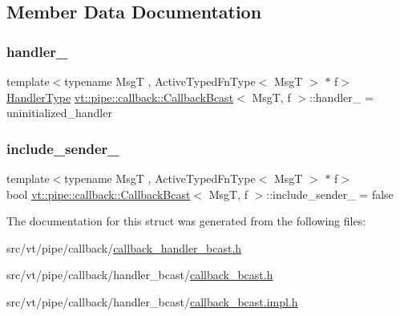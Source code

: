 \subsection{Member Data Documentation}
\mbox{\label{structvt_1_1pipe_1_1callback_1_1_callback_bcast_a3ea3dbcdb923e07ef664094954313eb1}} 
\subsubsection{\texorpdfstring{handler\+\_\+}{handler\_}}
{\footnotesize\ttfamily template$<$typename MsgT , Active\+Typed\+Fn\+Type$<$ Msg\+T $>$ $\ast$ f$>$ \\
\hyperlink{namespacevt_af64846b57dfcaf104da3ef6967917573}{Handler\+Type} \hyperlink{structvt_1_1pipe_1_1callback_1_1_callback_bcast}{vt\+::pipe\+::callback\+::\+Callback\+Bcast}$<$ MsgT, f $>$\+::handler\+\_\+ = uninitialized\+\_\+handler\hspace{0.3cm}{\ttfamily [private]}}

\mbox{\label{structvt_1_1pipe_1_1callback_1_1_callback_bcast_a143859ea6a28eec100d0e2b19d13b004}} 
\subsubsection{\texorpdfstring{include\+\_\+sender\+\_\+}{include\_sender\_}}
{\footnotesize\ttfamily template$<$typename MsgT , Active\+Typed\+Fn\+Type$<$ Msg\+T $>$ $\ast$ f$>$ \\
bool \hyperlink{structvt_1_1pipe_1_1callback_1_1_callback_bcast}{vt\+::pipe\+::callback\+::\+Callback\+Bcast}$<$ MsgT, f $>$\+::include\+\_\+sender\+\_\+ = false\hspace{0.3cm}{\ttfamily [private]}}



The documentation for this struct was generated from the following files\+:\begin{DoxyCompactItemize}
\item 
src/vt/pipe/callback/\hyperlink{callback__handler__bcast_8h}{callback\+\_\+handler\+\_\+bcast.\+h}\item 
src/vt/pipe/callback/handler\+\_\+bcast/\hyperlink{callback__bcast_8h}{callback\+\_\+bcast.\+h}\item 
src/vt/pipe/callback/handler\+\_\+bcast/\hyperlink{callback__bcast_8impl_8h}{callback\+\_\+bcast.\+impl.\+h}\end{DoxyCompactItemize}
